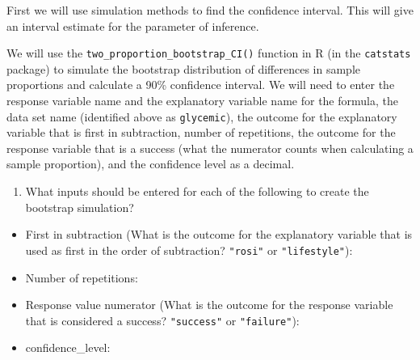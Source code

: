\documentclass[
]{report}
\providecommand{\tightlist}{%
  \setlength{\itemsep}{0pt}\setlength{\parskip}{0pt}}
\begin{document}
First we will use simulation methods to find the confidence interval. This will give an interval estimate for the parameter of inference.

We will use the \texttt{two\_proportion\_bootstrap\_CI()} function in R (in the \texttt{catstats} package) to simulate the bootstrap distribution of differences in sample proportions and calculate a 90\% confidence interval. We will need to enter the response variable name and the explanatory variable name for the formula, the data set name (identified above as \texttt{glycemic}), the outcome for the explanatory variable that is first in subtraction, number of repetitions, the outcome for the response variable that is a success (what the numerator counts when calculating a sample proportion), and the confidence level as a decimal.

\begin{enumerate}
\def\labelenumi{\arabic{enumi}.}
\setcounter{enumi}{6}
\tightlist
\item
  What inputs should be entered for each of the following to create the bootstrap simulation?
  \vspace{1mm}
\end{enumerate}

\begin{itemize}
\tightlist
\item
  First in subtraction (What is the outcome for the explanatory variable that is used as first in the order of subtraction? \texttt{"rosi"} or \texttt{"lifestyle"}):
\end{itemize}

\vspace{.15in}

\begin{itemize}
\tightlist
\item
  Number of repetitions:
\end{itemize}

\vspace{.15in}

\begin{itemize}
\tightlist
\item
  Response value numerator (What is the outcome for the response variable that is considered a success? \texttt{"success"} or \texttt{"failure"}):
\end{itemize}

\vspace{.15in}

\begin{itemize}
\tightlist
\item
  confidence\_level:
\end{itemize}
\end{document}
